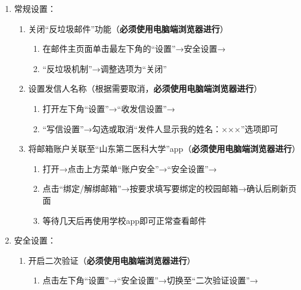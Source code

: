 \begin{enumerate}
\begin{enumerate}
              \item 常规设置：
                    \begin{enumerate}
                        \item 关闭“反垃圾邮件”功能\footnotemark（\textbf{必须使用电脑端浏览器进行}）
                              \begin{enumerate}
                                  \item 在邮件主页面单击最左下角的“设置”→安全设置→
                                  \item “反垃圾机制”→调整选项为“关闭”
                              \end{enumerate}
                        \item 设置发信人名称（根据需要取消，\textbf{必须使用电脑端浏览器进行}）
                              \begin{enumerate}
                                  \item 打开左下角“设置”→“收发信设置”→
                                  \item “写信设置”→勾选或取消“发件人显示我的姓名：×××”选项即可
                              \end{enumerate}
                        \item 将邮箱账户关联至“山东第二医科大学”app（\textbf{必须使用电脑端浏览器进行}）
                              \begin{enumerate}
                                  \item 打开→点击上方菜单“账户安全”→“安全设置”→
                                  \item 点击“绑定/解绑邮箱”→按要求填写要绑定的校园邮箱→确认后刷新页面
                                  \item 等待几天后再使用学校app即可正常查看邮件
                              \end{enumerate}
                    \end{enumerate}
              \item 安全设置：
                    \begin{enumerate}
                        \item 开启二次验证（\textbf{必须使用电脑端浏览器进行}）
                              \begin{enumerate}
                                  \item 点击左下角“设置”→“安全设置”→切换至“二次验证设置”→

\end{enumerate}
\end{enumerate}
\end{enumerate}
\end{enumerate}
